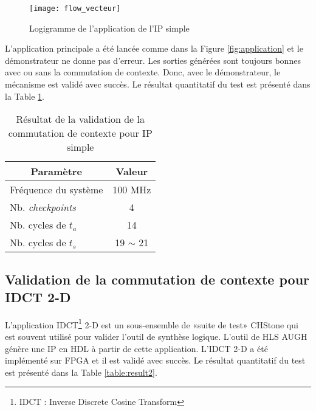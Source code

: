 \begin{figure}[h]
	\centering
	\texttt{[image: flow\_vecteur]}
	\caption{Logigramme de l'application de l'IP simple}
	\label{fig:flow_vecteur}
	\vspace{-2mm}
\end{figure}

L'application principale a été lancée comme dans la Figure \ref{fig:application} et le démonstrateur ne donne pas
d'erreur. Les sorties générées sont toujours bonnes avec ou sans la commutation de contexte. Donc, avec le
démonstrateur, le mécanisme est validé avec succès.
Le résultat quantitatif du test est présenté dans la Table \ref{table:result1}.

\begin{table}[h]
	\caption{Résultat de la validation de la commutation de contexte pour IP simple}
 	\label{table:result1}
	\vspace{-2mm}
	\begin{center}
		\begin{tabular}{|l|c|}
			\hline
			\multicolumn{1}{|c|}{\cellcolor{black!30} \textbf{Paramètre}}   				& 	\multicolumn{1}{c|}{\cellcolor{black!30} \textbf{Valeur}} 	\\
			\hline
			Fréquence du système	&	100 MHz	\\
			Nb. \emph{checkpoints}	&	4 		\\
			Nb. cycles de $t_a$		&	14		\\
			Nb. cycles de $t_s$		&	19 $\sim$ 21 \\
			\hline
		\end{tabular}
	\end{center}
	\vspace{-5mm}
\end{table}

\subsection{Validation de la commutation de contexte pour IDCT 2-D}

L'application IDCT\footnote{IDCT : Inverse Discrete Cosine Transform} 2-D est un sous-ensemble de «suite de test» CHStone
qui est souvent utilisé pour valider l'outil de synthèse logique. L'outil de HLS AUGH génère
une IP en HDL à partir de cette application. L'IDCT 2-D a été implémenté sur FPGA et
il est validé avec succès. Le résultat quantitatif du test est présenté dans la Table \ref{table:result2}.

